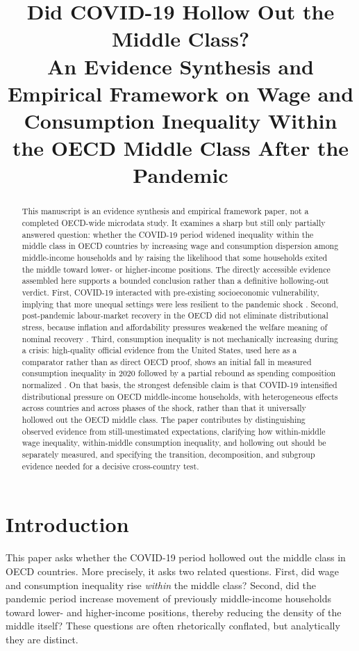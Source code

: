 \documentclass[11pt]{article}
\title{Did COVID-19 Hollow Out the Middle Class?\\An Evidence Synthesis and Empirical Framework on Wage and Consumption Inequality Within the OECD Middle Class After the Pandemic}
\author{}
\date{}
\begin{document}
\maketitle

\begin{abstract}
This manuscript is an evidence synthesis and empirical framework paper, not a completed OECD-wide microdata study. It examines a sharp but still only partially answered question: whether the COVID-19 period widened inequality within the middle class in OECD countries by increasing wage and consumption dispersion among middle-income households and by raising the likelihood that some households exited the middle toward lower- or higher-income positions. The directly accessible evidence assembled here supports a bounded conclusion rather than a definitive hollowing-out verdict. First, COVID-19 interacted with pre-existing socioeconomic vulnerability, implying that more unequal settings were less resilient to the pandemic shock \citep{covid19andincomein2021springer}. Second, post-pandemic labour-market recovery in the OECD did not eliminate distributional stress, because inflation and affordability pressures weakened the welfare meaning of nominal recovery \citep{oecdemploymentoutl2024oecd,societyataglance202024bolletti}. Third, consumption inequality is not mechanically increasing during a crisis: high-quality official evidence from the United States, used here as a comparator rather than as direct OECD proof, shows an initial fall in measured consumption inequality in 2020 followed by a partial rebound as spending composition normalized \citep{consumptioninequal2024bls}. On that basis, the strongest defensible claim is that COVID-19 intensified distributional pressure on OECD middle-income households, with heterogeneous effects across countries and across phases of the shock, rather than that it universally hollowed out the OECD middle class. The paper contributes by distinguishing observed evidence from still-unestimated expectations, clarifying how within-middle wage inequality, within-middle consumption inequality, and hollowing out should be separately measured, and specifying the transition, decomposition, and subgroup evidence needed for a decisive cross-country test.
\end{abstract}

\section{Introduction}
This paper asks whether the COVID-19 period hollowed out the middle class in OECD countries. More precisely, it asks two related questions. First, did wage and consumption inequality rise \emph{within} the middle class? Second, did the pandemic period increase movement of previously middle-income households toward lower- and higher-income positions, thereby reducing the density of the middle itself? These questions are often rhetorically conflated, but analytically they are distinct.
\end{document}
